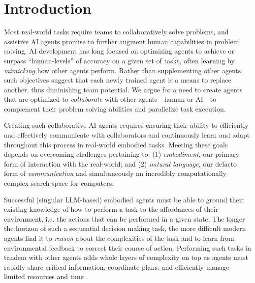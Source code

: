     

\section{Introduction}

Most real-world tasks require teams to collaboratively solve problems, and assistive AI agents promise to further augment human capabilities in problem solving.
AI development has long focused on optimizing agents to achieve or surpass ``human-levels'' of accuracy on a given set of tasks, often learning by {\it mimicking} how other agents perform.
Rather than supplementing other agents, such objectives suggest that each newly trained agent is a means to replace another, thus diminishing team potential.
We argue for a need to create agents that are optimized to {\it collaborate} with other agents---human or AI---to complement their problem solving abilities and parallelize task execution. 

Creating such collaborative AI agents requires ensuring their ability to efficiently and effectively communicate with collaborators and continuously learn and adapt throughout this process in real-world embodied tasks. 
Meeting these goals depends on overcoming challenges pertaining to: (1) \textit{embodiment}, our primary form of interaction with the real-world; and (2) \textit{natural language}, our defacto form of \textit{communication} and simultaneously an incredibly computationally complex search space for computers.

Successful (singular LLM-based) embodied agents must be able to ground their existing knowledge of how to perform a task to the affordances of their environment, i.e. the actions that can be performed in a given state.
The longer the horizon of such a sequential decision making task, the more difficult modern agents find it to \textit{reason} about the complexities of the task and to learn from environmental feedback to correct their course of action.
Performing such tasks in tandem with other agents adds whole layers of complexity on top as agents must rapidly share critical information, coordinate plans, and efficiently manage limited resources and time \cite{cemri2025multi, guo2024large}.

